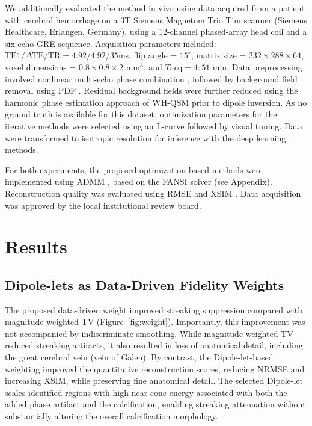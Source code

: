 \documentclass{article}
\begin{document}
We additionally evaluated the method in vivo using data acquired from a patient with cerebral hemorrhage on a 3T Siemens Magnetom Trio Tim scanner (Siemens Healthcare, Erlangen, Germany), using a 12-channel phased-array head coil and a six-echo GRE sequence. Acquisition parameters included: $\text{TE}1/\Delta\text{TE}/\text{TR} = 4.92/4.92/35 \text{ms}$, flip angle = $15^\circ$, matrix size = $232 \times 288 \times 64$, voxel dimensions = $0.8 \times 0.8 \times 2\text{ mm}^3$, and $T\text{acq} = 4{:}51$ min. Data preprocessing involved nonlinear multi-echo phase combination \cite{liu2013nonlinear}, followed by background field removal using PDF \cite{liu2011novel}. Residual background fields were further reduced using the harmonic phase estimation approach of WH-QSM \cite{milovic2019weak} prior to dipole inversion. As no ground truth is available for this dataset, optimization parameters for the iterative methods were selected using an L-curve followed by visual tuning. Data were transformed to isotropic resolution for inference with the deep learning methods.

For both experiments, the proposed optimization-based methods were implemented using ADMM \cite{boyd2011distributed,milovic2018fast}, based on the FANSI solver \cite{milovic2018fast} (see Appendix). Reconstruction quality was evaluated using RMSE and XSIM \cite{milovic2025xsim}. Data acquisition was approved by the local institutional review board.



\section{Results}\label{sec:results}
\subsection{Dipole-lets as Data-Driven Fidelity Weights}\label{sec:resultsWeight}
The proposed data-driven weight improved streaking suppression compared with magnitude-weighted TV (Figure~\ref{fig:weight}). Importantly, this improvement was not accompanied by indiscriminate smoothing. While magnitude-weighted TV reduced streaking artifacts, it also resulted in loss of anatomical detail, including the great cerebral vein (vein of Galen). By contrast, the Dipole-let-based weighting improved the quantitative reconstruction scores, reducing NRMSE and increasing XSIM, while preserving fine anatomical detail. The selected Dipole-let scales identified regions with high near-cone energy associated with both the added phase artifact and the calcification, enabling streaking attenuation without substantially altering the overall calcification morphology.
\end{document}
